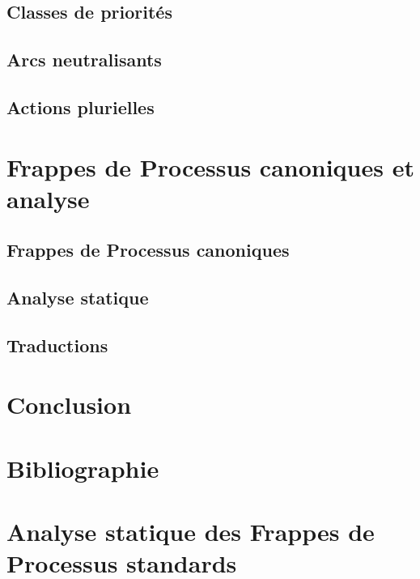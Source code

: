 \documentclass[fleqn,8pt,t]{beamer}
\begin{document}
\subsection{Classes de priorités}


\subsection{Arcs neutralisants}


\subsection{Actions plurielles}



\section{Frappes de Processus canoniques et analyse}
\subsection{Frappes de Processus canoniques}


\subsection{Analyse statique}

\subsection{Traductions}




\section{Conclusion}




\appendix
{}
\setcounter{finalframe}{\value{framenumber}}

\section[x]{Bibliographie}


\section[x]{Analyse statique des Frappes de Processus standards}


\setcounter{framenumber}{\value{finalframe}}
\end{document}
